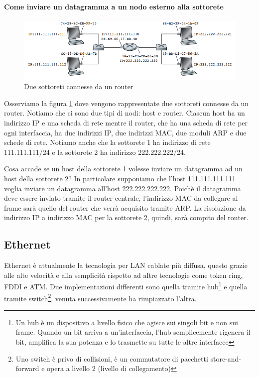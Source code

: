 \documentclass[11pt,a4paper]{book}
\begin{document}
\paragraph{Come inviare un datagramma a un nodo esterno alla sottorete}
\begin{figure}
	\includegraphics[scale=0.5]{img/085.png}
	\caption{Due sottoreti connesse da un router}
	\label{fig: 085}
\end{figure}
Osserviamo la figura \ref{fig: 085} dove vengono rappresentate due sottoreti connesse da un router. Notiamo che ci sono due tipi di nodi: host e router. Ciascun host ha un indirizzo IP e una scheda di rete mentre il router, che ha una scheda di rete per ogni interfaccia, ha due indirizzi IP, due indirizzi MAC, due moduli ARP e due schede di rete. Notiamo anche che la sottorete 1 ha indirizzo di rete 111.111.111/24 e la sottorete 2 ha indirizzo 222.222.222/24.

Cosa accade se un host della sottorete 1 volesse inviare un datagramma ad un host della sottorete 2? In particolare supponiamo che l'host 111.111.111.111 voglia inviare un datagramma all'host 222.222.222.222. Poichè il datagramma deve essere inviato tramite il router centrale, l'indirizzo MAC da collegare al frame sarà quello del router che verrà acquisito tramite ARP. La risoluzione da indirizzo IP a indirizzo MAC per la sottorete 2, quindi, sarà compito del router.

\subsection{Ethernet}
Ethernet è attualmente la tecnologia per LAN cablate più diffusa, questo grazie alle alte velocità e alla semplicità rispetto ad altre tecnologie come token ring, FDDI e ATM. Due implementazioni differenti sono quella tramite hub\footnote{Un hub è un dispositivo a livello fisico che agisce sui singoli bit e non sui frame. Quando un bit arriva a un'interfaccia, l'hub semplicemente rigenera il bit, amplifica la sua potenza e lo trasmette su tutte le altre interfacce} e quella tramite switch\footnote{Uno switch è privo di collisioni, è un commutatore di pacchetti store-and-forward e opera a livello 2 (livello di collegamento)}, venuta successivamente ha rimpiazzato l'altra.
\end{document}
